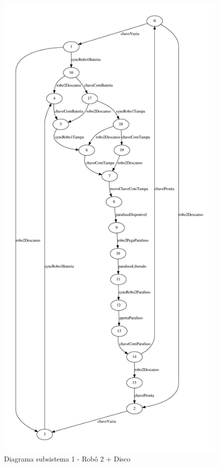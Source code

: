 \documentclass[a4paper,11pt,twocolumns]{article}
\begin{document}
\newpage
\begin{figure}[H]
    \centering
    \includegraphics[height = 0.95\textheight]{./img/g_sistema3.pdf}
    \caption{Diagrama subsistema 1 - Robô 2 + Disco}
    \label{fig:g_subsis3}
\end{figure}
\end{document}
